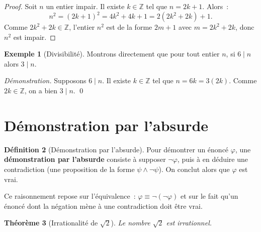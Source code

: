\documentclass[12pt,a4paper,openany]{book}
\theoremstyle{definition}
\newtheorem{definition}{Définition}[chapter]
\newtheorem{exemple}[definition]{Exemple}
\theoremstyle{plain}
\newtheorem{theoreme}[definition]{Théorème}
\theoremstyle{remark}
\newcommand{\Z}{\mathbb{Z}}
\begin{document}
\begin{proof}
  Soit $n$ un entier impair. Il existe $k \in \Z$ tel que $n = 2k + 1$. Alors~:
  \[
    n^2 = (2k+1)^2 = 4k^2 + 4k + 1 = 2(2k^2 + 2k) + 1.
  \]
  Comme $2k^2 + 2k \in \Z$, l'entier $n^2$ est de la forme $2m + 1$ avec $m = 2k^2 + 2k$, donc $n^2$ est impair.
\end{proof}

\begin{exemple}[Divisibilit\'e]\label{ex:div-directe}
  Montrons directement que pour tout entier $n$, si $6 \mid n$ alors $3 \mid n$.

  \smallskip
  \noindent\textit{D\'emonstration.} Supposons $6 \mid n$. Il existe $k \in \Z$ tel que $n = 6k = 3(2k)$. Comme $2k \in \Z$, on a bien $3 \mid n$. \qed
\end{exemple}

\section{D\'emonstration par l'absurde}
\label{sec:preuve-absurde}

\begin{definition}[D\'emonstration par l'absurde]\label{def:preuve-absurde}
  Pour d\'emontrer un \'enonc\'e $\varphi$, une \textbf{d\'emonstration par l'absurde} consiste \`a supposer $\neg\varphi$, puis \`a en d\'eduire une contradiction (une proposition de la forme $\psi \land \neg\psi$). On conclut alors que $\varphi$ est vrai.

  \smallskip
  Ce raisonnement repose sur l'\'equivalence~: $\varphi \equiv \neg(\neg\varphi)$ et sur le fait qu'un \'enonc\'e dont la n\'egation m\`ene \`a une contradiction doit \^etre vrai.
\end{definition}

\begin{theoreme}[Irrationalit\'e de $\sqrt{2}$]\label{thm:sqrt2-irr}
  Le nombre $\sqrt{2}$ est irrationnel.
\end{theoreme}
\end{document}
